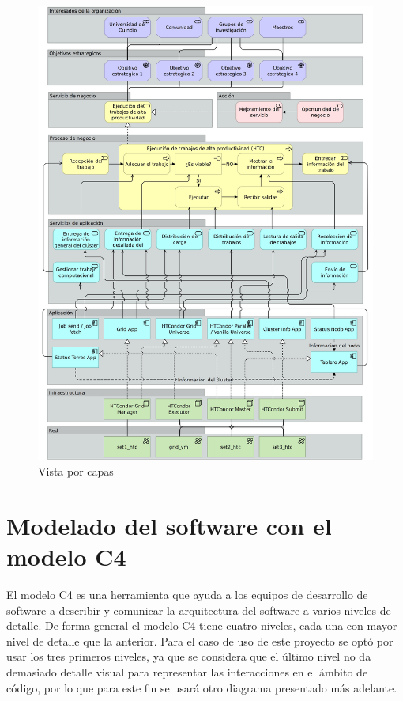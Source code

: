 \begin{figure}[H]
	\centering
	\includegraphics[scale=0.125]{tablas-images/archi/Layered View.jpg}
	\caption{Vista por capas}
    \label{fig:archiLayeredView}
\end{figure}

\section{Modelado del software con el modelo C4}
\noindent
El modelo C4 es una herramienta que ayuda a los equipos de desarrollo de software a describir y comunicar la arquitectura del software a varios niveles de detalle. De forma general el modelo C4 tiene cuatro niveles, cada una con mayor nivel de detalle que la anterior. Para el caso de uso de este proyecto se optó por usar los tres primeros niveles, ya que se considera que el último nivel no da demasiado detalle visual para representar las interacciones en el ámbito de código, por lo que para este fin se usará otro diagrama presentado más adelante.

